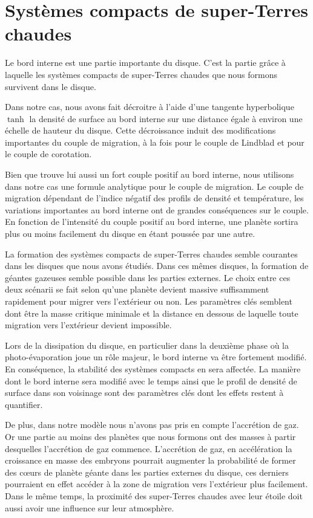 \section{Systèmes compacts de super-Terres chaudes}
Le bord interne est une partie importante du disque. C'est la partie grâce à laquelle les systèmes compacts de super-Terres chaudes que nous formons survivent dans le disque. 

Dans notre cas, nous avons fait décroitre à l'aide d'une tangente hyperbolique $\tanh$ la densité de surface au bord interne sur
une distance égale à environ une échelle de hauteur du disque. Cette décroissance induit des modifications importantes du couple
de migration, à la fois pour le couple de Lindblad et pour le couple de corotation. 

Bien que \cite{masset2006disk} trouve lui aussi un fort couple positif au bord interne, nous utilisons dans notre cas une formule analytique pour le couple de migration. Le couple de migration dépendant de l'indice négatif des profils de densité et température, les variations importantes au bord interne ont de grandes conséquences sur le couple. En fonction de l'intensité du couple positif au bord interne, une planète sortira plus ou moins facilement du disque en étant poussée par une autre. 

La formation des systèmes compacts de super-Terres chaudes semble courantes dans les disques que nous avons étudiés. Dans ces mêmes disques, la formation de géantes gazeuses semble possible dans les parties externes. Le choix entre ces deux scénarii se fait selon qu'une planète devient massive suffisamment rapidement pour migrer vers l'extérieur ou non. Les paramètres clés semblent dont être la masse critique minimale et la distance en dessous de laquelle toute migration vers l'extérieur devient impossible.

Lors de la dissipation du disque, en particulier dans la deuxième phase où la photo-évaporation joue un rôle majeur, le bord interne va être fortement modifié. En conséquence, la stabilité des systèmes compacts en sera affectée. La manière dont le bord interne sera modifié avec le temps ainsi que le profil de densité de surface dans son voisinage sont des paramètres clés dont les effets restent à quantifier. 

De plus, dans notre modèle nous n'avons pas pris en compte l'accrétion de gaz. Or une partie au moins des planètes que nous
formons ont des masses à partir desquelles l'accrétion de gaz commence. L'accrétion de gaz, en accélération la croissance en
masse des embryons pourrait augmenter la probabilité de former des cœurs de planète géante dans les parties externes du
disque, ces derniers pourraient en effet accéder à la zone de migration vers l'extérieur plus facilement. Dans le même temps, la
proximité des super-Terres chaudes avec leur étoile doit aussi avoir une influence sur leur atmosphère. 

